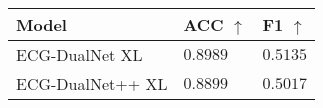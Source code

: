 \begin{tabular}{>{\raggedright\arraybackslash}p{}>{\raggedright\arraybackslash}p{}>{\raggedright\arraybackslash}p{}}
    \hline
	Model & ACC $\uparrow$ & F1 $\uparrow$ \\
	\hline
	ECG-DualNet XL & $0.8989$ & $0.5135$ \\
	ECG-DualNet++ XL & $0.8899$ & $0.5017$ \\
	\hline
\end{tabular}
